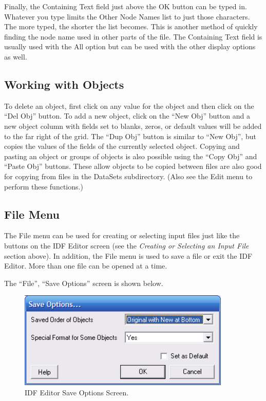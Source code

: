 Finally, the Containing Text field just above the OK button can be typed in. Whatever you type limits the Other Node Names list to just those characters. The more typed, the shorter the list becomes. This is another method of quickly finding the node name used in other parts of the file. The Containing Text field is usually used with the All option but can be used with the other display options as well.

\subsection{Working with Objects}\label{working-with-objects}

To delete an object, first click on any value for the object and then click on the ``Del Obj'' button. To add a new object, click on the ``New Obj'' button and a new object column with fields set to blanks, zeros, or default values will be added to the far right of the grid. The ``Dup Obj'' button is similar to ``New Obj'', but copies the values of the fields of the currently selected object. Copying and pasting an object or groups of objects is also possible using the ``Copy Obj'' and ``Paste Obj'' buttons. These allow objects to be copied between files are also good for copying from files in the DataSets subdirectory. (Also see the Edit menu to perform these functions.)

\subsection{File Menu}\label{file-menu-000}

The File menu can be used for creating or selecting input files just like the buttons on the IDF Editor screen (see the \emph{Creating or Selecting an Input File} section above). In addition, the File menu is used to save a file or exit the IDF Editor. More than one file can be opened at a time.

The ``File'', ``Save Options'' screen is shown below.

\begin{figure}[hbtp] %
\centering
\includegraphics[width=0.9\textwidth, height=0.9\textheight, keepaspectratio=true]{media/image117.png}
\caption{IDF Editor Save Options Screen. \protect \label{fig:idf-editor-save-options-screen.}}
\end{figure}

